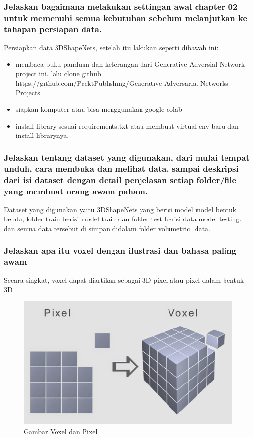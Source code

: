 \subsubsection{Jelaskan bagaimana melakukan settingan awal chapter 02 untuk memenuhi semua kebutuhan sebelum melanjutkan ke tahapan persiapan data.}
\hfill\break
Persiapkan data 3DShapeNets, setelah itu lakukan seperti dibawah ini:
\begin{itemize}
	\item membaca buku panduan dan keterangan dari Generative-Adversial-Network project ini. lalu clone github https://github.com/PacktPublishing/Generative-Adversarial-Networks-Projects
	\item siapkan komputer atau bisa menggunakan google colab
	\item install library sesuai requirements.txt atau membuat virtual env baru dan install librarynya.
\end{itemize}

\subsubsection{Jelaskan tentang dataset yang digunakan, dari mulai tempat unduh, cara membuka dan melihat data. sampai deskripsi dari isi dataset dengan detail penjelasan setiap folder/file yang membuat orang awam paham.}
\hfill\break
Dataset yang digunakan yaitu 3DShapeNets yang berisi model model bentuk benda, folder train berisi model train dan folder test berisi data model testing. dan semua data tersebut di simpan didalam folder volumetric\_data.

\subsubsection{Jelaskan apa itu voxel dengan ilustrasi dan bahasa paling awam}
\hfill\break
Secara singkat, voxel dapat diartikan sebagai 3D pixel atau pixel dalam bentuk 3D
\begin{figure}[H]
	\centering
	\includegraphics[width=12cm]{figures/1174067/8/no6.png}
	\caption{Gambar Voxel dan Pixel}
\end{figure}

